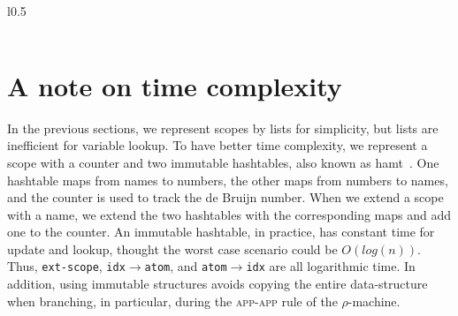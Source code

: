 \documentclass[a4paper,UKenglish]{lipics-v2016}
\newcommand{\clos}[2] {
  \langle #1; #2 \rangle
}
\newcommand{\app}[2] {
  (#1\, #2)
}
\newcommand{\pr}[2] {
 (#1\, #2)
}
\newcommand{\bd}[2] {
 #1/ #2
}
\newcommand*{\transname}[1]{\textsc{#1}}
\begin{document}
\begin{wrapfigure}{l}{0.5\textwidth}
\begin{minipage}[b]{0.4\textwidth}
\begin{tabular}{l}

  \end{tabular}
  \end{minipage}
\end{wrapfigure}

\section{A note on time complexity}
    \label{efficiency}

In the previous sections, we represent scopes by lists for simplicity,
but lists are inefficient for variable lookup.  To have better time
complexity, we represent a scope with a counter and two immutable
hashtables, also known as hamt~\citep{bagwell_ideal_2001}.  One
hashtable maps from names to numbers, the other maps from numbers to
names, and the counter is used to track the de Bruijn number.  When we
extend a scope with a name, we extend the two hashtables with the
corresponding maps and add one to the counter.  An immutable
hashtable, in practice, has constant time for update and lookup,
thought the worst case scenario could be $O(log(n))$.  Thus,
\texttt{ext-scope}, \texttt{idx$\rightarrow$atom}, and
\texttt{atom$\rightarrow$idx} are all logarithmic time.  In addition,
using immutable structures avoids copying the entire data-structure
when branching, in particular, during the \transname{app-app} rule of
the $\rho$-machine.
\end{document}
